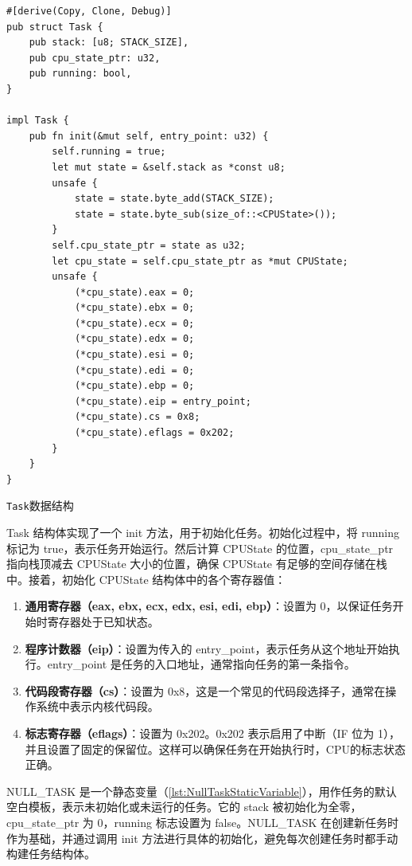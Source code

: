 \begin{listing}[htbp]
    \begin{verbatim}
#[derive(Copy, Clone, Debug)]
pub struct Task {
    pub stack: [u8; STACK_SIZE],
    pub cpu_state_ptr: u32,
    pub running: bool,
}

impl Task {
    pub fn init(&mut self, entry_point: u32) {
        self.running = true;
        let mut state = &self.stack as *const u8;
        unsafe {
            state = state.byte_add(STACK_SIZE);
            state = state.byte_sub(size_of::<CPUState>());
        }
        self.cpu_state_ptr = state as u32;
        let cpu_state = self.cpu_state_ptr as *mut CPUState;
        unsafe {
            (*cpu_state).eax = 0;
            (*cpu_state).ebx = 0;
            (*cpu_state).ecx = 0;
            (*cpu_state).edx = 0;
            (*cpu_state).esi = 0;
            (*cpu_state).edi = 0;
            (*cpu_state).ebp = 0;
            (*cpu_state).eip = entry_point;
            (*cpu_state).cs = 0x8;
            (*cpu_state).eflags = 0x202;
        }
    }
}
    \end{verbatim}
    \caption{\texttt{Task}数据结构}\label{lst:TaskDataStructure}
\end{listing}

Task 结构体实现了一个 init 方法，用于初始化任务。初始化过程中，将 running 标记为 true，表示任务开始运行。然后计算 CPUState 的位置，cpu\_state\_ptr 指向栈顶减去 CPUState 大小的位置，确保 CPUState 有足够的空间存储在栈中。接着，初始化 CPUState 结构体中的各个寄存器值：

\begin{enumerate}
    \item \textbf{通用寄存器（eax, ebx, ecx, edx, esi, edi, ebp）}：设置为 0，以保证任务开始时寄存器处于已知状态。
    \item \textbf{程序计数器（eip）}：设置为传入的 entry\_point，表示任务从这个地址开始执行。entry\_point 是任务的入口地址，通常指向任务的第一条指令。
    \item \textbf{代码段寄存器（cs）}：设置为 0x8，这是一个常见的代码段选择子，通常在操作系统中表示内核代码段。
    \item \textbf{标志寄存器（eflags）}：设置为 0x202。0x202 表示启用了中断（IF 位为 1），并且设置了固定的保留位。这样可以确保任务在开始执行时，CPU的标志状态正确。
\end{enumerate}

NULL\_TASK 是一个静态变量（\cref{lst:NullTaskStaticVariable}），用作任务的默认空白模板，表示未初始化或未运行的任务。它的 stack 被初始化为全零，cpu\_state\_ptr 为 0，running 标志设置为 false。NULL\_TASK 在创建新任务时作为基础，并通过调用 init 方法进行具体的初始化，避免每次创建任务时都手动构建任务结构体。

